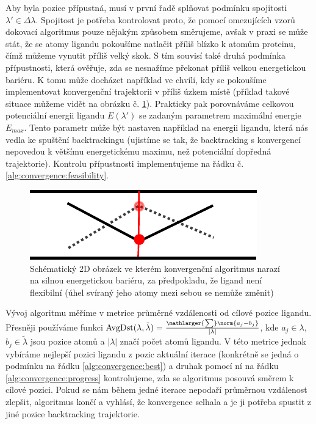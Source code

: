 Aby byla pozice přípustná,
musí v první řadě splňovat podmínku spojitosti $ \lambda' \in \Delta\lambda $.
Spojitost je potřeba kontrolovat proto, že pomocí omezujících vzorů dokovací algoritmus
pouze nějakým způsobem směrujeme, avšak v praxi se může stát, že se atomy ligandu
pokoušíme natlačit příliš blízko k atomům proteinu, čímž můžeme vynutit příliš
velký skok. S tím souvisí také druhá podmínka přípustnosti, která ověřuje, zda
se nesnažíme překonat příliš velkou energetickou bariéru. K tomu může docházet
například ve chvíli, kdy se pokoušíme implementovat konvergenční trajektorii
v příliš úzkem místě (příklad takové situace můžeme vidět na obrázku č.
\ref{fig:narrow_tunnel}). Prakticky pak porovnáváme celkovou potenciální energii
ligandu $ E(\lambda') $ se zadaným parametrem maximální energie $ E_{max} $.
Tento parametr může být nastaven například na energii ligandu, která nás vedla ke
spuštění backtrackingu (ujistíme se tak, že backtracking s konvergencí nepovedou
k většímu energetickému maximu, než potenciální dopředná trajektorie). Kontrolu
přípustnosti implementujeme na řádku č. \ref{alg:convergence:feasibility}.

\begin{figure}[ht]
\centering
\includegraphics[width=.5\hsize]{img/narrow_tunnel.pdf}
\caption{Schématický 2D obrázek ve kterém konvergenční algoritmus narazí na
silnou energetickou bariéru, za předpokladu, že ligand není flexibilní (úhel
svíraný jeho atomy mezi sebou se nemůže změnit)}
\label{fig:narrow_tunnel}
\end{figure}

Vývoj algoritmu měříme v metrice průměrné vzdálenosti od cílové pozice
ligandu. Přesněji používáme funkci
$ \operatorname{AvgDst}(\lambda, \tilde{\lambda})
    = \frac{\mathlarger{\sum}\norm{a_j - b_j}}{|\lambda|} $, kde $ a_j \in \lambda $,
$ b_j \in \tilde{\lambda} $ jsou pozice atomů a $ |\lambda| $ značí počet atomů ligandu.
V této metrice jednak vybíráme nejlepší pozici ligandu z pozic aktuální iterace
(konkrétně se jedná o podmínku na řádku \ref{alg:convergence:best}) a druhak
pomocí ní na řádku \ref{alg:convergence:progress} kontrolujeme, zda se algoritmus
posouvá směrem k cílové pozici. Pokud se nám během jedné iterace nepodaří průměrnou
vzdálenost zlepšit, algoritmus končí a vyhlásí, že konvergence selhala a je ji
potřeba spustit z jiné pozice backtracking trajektorie.

